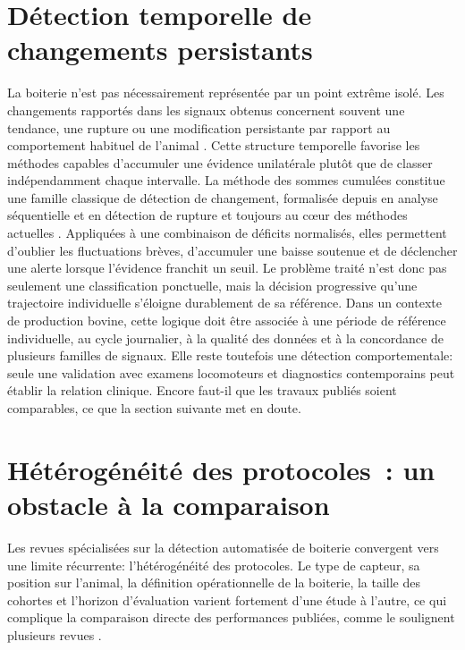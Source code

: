\section{Détection temporelle de changements persistants}

La boiterie n'est pas nécessairement représentée par un point extrême isolé. Les changements
rapportés dans les signaux obtenus concernent souvent une tendance, une rupture ou une
modification persistante par rapport au comportement habituel de l'animal
\citep{alsaaod2019automatic,paudyal2021lying}. Cette structure temporelle favorise les
méthodes capables d'accumuler une évidence unilatérale plutôt que de classer indépendamment
chaque intervalle.
La méthode des sommes cumulées \citep{page1954continuous} constitue une famille
classique de détection de changement, formalisée depuis en analyse séquentielle et en
détection de rupture \citep{basseville1993detection} et toujours au cœur des méthodes
actuelles \citep{truong2020selective}. Appliquées à une combinaison de déficits normalisés,
elles permettent d'oublier les fluctuations brèves, d'accumuler une baisse soutenue et de
déclencher une alerte lorsque l'évidence franchit un seuil. Le problème traité n'est donc pas
seulement une classification ponctuelle, mais la décision progressive qu'une trajectoire
individuelle s'éloigne durablement de sa référence. Dans un contexte de production bovine,
cette logique doit
être associée à une période de référence individuelle, au cycle journalier, à la qualité des
données et à la concordance de plusieurs familles de signaux. Elle reste toutefois une détection
comportementale: seule une validation avec examens locomoteurs et diagnostics contemporains
peut établir la relation clinique. Encore faut-il que les travaux publiés soient comparables,
ce que la section suivante met en doute.

\section{Hétérogénéité des protocoles~: un obstacle à la comparaison}
\label{sec:heterogeneite}

Les revues spécialisées sur la détection automatisée de boiterie convergent vers une
limite récurrente: l'hétérogénéité des protocoles. Le type de capteur, sa position sur
l'animal, la définition opérationnelle de la boiterie, la taille des cohortes et l'horizon
d'évaluation varient fortement d'une étude à l'autre, ce qui complique la comparaison
directe des performances publiées, comme le soulignent plusieurs revues
\citep{oleary2020accelerometers,alsaaod2019automatic}.

